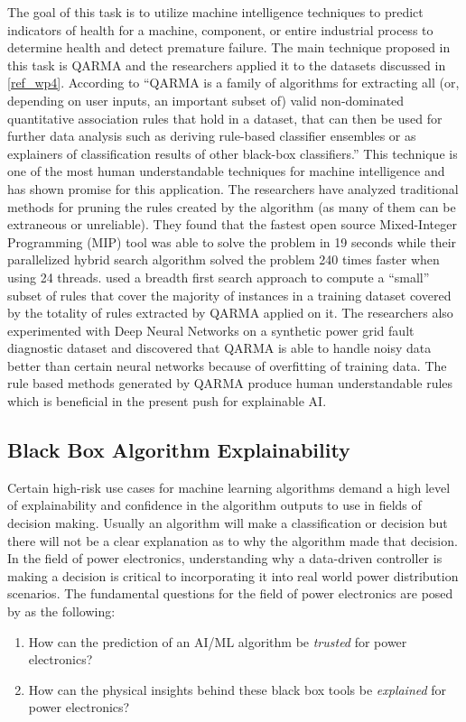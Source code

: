 The goal of this task is to utilize machine intelligence techniques to predict indicators of health for a machine, component, or entire industrial process to determine health and detect premature failure. The main technique proposed in this task is QARMA and the researchers applied it to the datasets discussed in \ref{ref_wp4}. According to \cite{wp5.1} ``QARMA is a family of algorithms for extracting all (or, depending on user inputs, an important subset of) valid non-dominated quantitative association rules that hold in a dataset, that can then be used for further data analysis such as deriving rule-based classifier ensembles or as explainers of classification results of other black-box classifiers.'' This technique is one of the most human understandable techniques for machine intelligence and has shown promise for this application. The researchers have analyzed traditional methods for pruning the rules created by the algorithm (as many of them can be extraneous or unreliable). They found that the fastest open source Mixed-Integer Programming (MIP) tool was able to solve the problem in 19 seconds while their parallelized hybrid search algorithm solved the problem 240 times faster when using 24 threads. \cite{wp5.1} used a breadth first search approach to compute a ``small'' subset of rules that cover the majority of instances in a training dataset covered by the totality of rules extracted by QARMA applied on it. The researchers also experimented with Deep Neural Networks on a synthetic power grid fault diagnostic dataset and discovered that QARMA is able to handle noisy data better than certain neural networks because of overfitting of training data. The rule based methods generated by QARMA produce human understandable rules which is beneficial in the present push for explainable AI.

\subsection{Black Box Algorithm Explainability}

Certain high-risk use cases for machine learning algorithms demand a high level of explainability and confidence in the algorithm outputs to use in fields of decision making. Usually an algorithm will make a classification or decision but there will not be a clear explanation as to why the algorithm made that decision. In the field of power electronics, understanding why a data-driven controller is making a decision is critical to incorporating it into real world power distribution scenarios. The fundamental questions for the field of power electronics are posed by \cite{black-box-explainability} as the following:
\begin{enumerate}
    \item How can the prediction of an AI/ML algorithm be \textit{trusted} for power electronics?
    \item How can the physical insights behind these black box tools be \textit{explained} for power electronics?
\end{enumerate}

